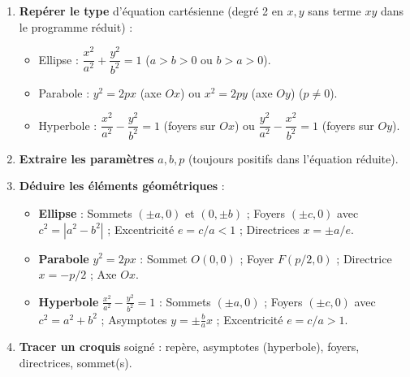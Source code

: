 \documentclass[11pt]{article}
\begin{document}
\begin{methode}
    \begin{enumerate}
        \item \textbf{Repérer le type} d'équation cartésienne (degré 2 en $x,y$ sans terme $xy$ dans le programme réduit) :
        \begin{itemize}
            \item Ellipse : $\dfrac{x^2}{a^2} + \dfrac{y^2}{b^2} = 1$ ($a>b>0$ ou $b>a>0$).
            \item Parabole : $y^2 = 2px$ (axe $Ox$) ou $x^2 = 2py$ (axe $Oy$) ($p \neq 0$).
            \item Hyperbole : $\dfrac{x^2}{a^2} - \dfrac{y^2}{b^2} = 1$ (foyers sur $Ox$) ou $\dfrac{y^2}{a^2} - \dfrac{x^2}{b^2} = 1$ (foyers sur $Oy$).
        \end{itemize}
        \item \textbf{Extraire les paramètres} $a, b, p$ (toujours positifs dans l'équation réduite).
        \item \textbf{Déduire les éléments géométriques} :
        \begin{itemize}
            \item \textbf{Ellipse} : Sommets $(\pm a, 0)$ et $(0, \pm b)$ ; Foyers $(\pm c, 0)$ avec $c^2 = |a^2-b^2|$ ; Excentricité $e = c/a < 1$ ; Directrices $x = \pm a/e$.
            \item \textbf{Parabole} $y^2=2px$ : Sommet $O(0,0)$ ; Foyer $F(p/2, 0)$ ; Directrice $x = -p/2$ ; Axe $Ox$.
            \item \textbf{Hyperbole} $\frac{x^2}{a^2}-\frac{y^2}{b^2}=1$ : Sommets $(\pm a, 0)$ ; Foyers $(\pm c, 0)$ avec $c^2 = a^2+b^2$ ; Asymptotes $y = \pm \frac{b}{a}x$ ; Excentricité $e = c/a > 1$.
        \end{itemize}
        \item \textbf{Tracer un croquis} soigné : repère, asymptotes (hyperbole), foyers, directrices, sommet(s).
    \end{enumerate}
\end{methode}
\end{document}
